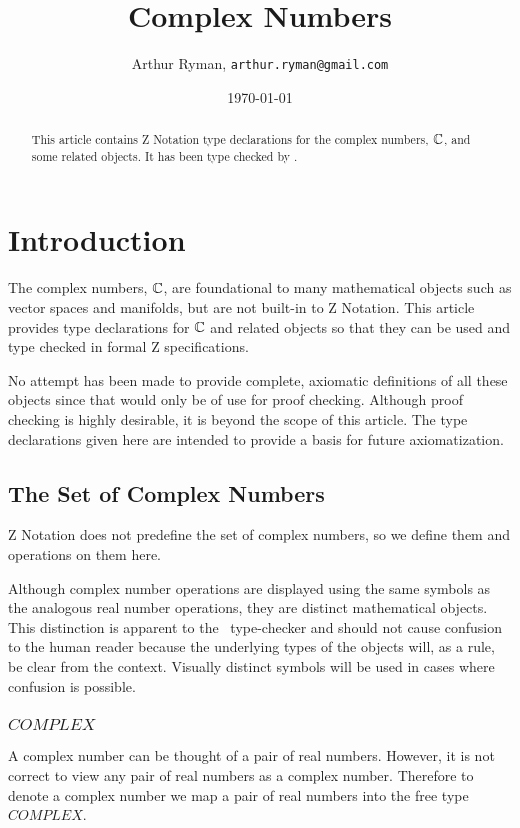 \documentclass[11pt, oneside]{article}
\title{Complex Numbers}
\author{Arthur Ryman, {\tt arthur.ryman@gmail.com}}
\date{\today}
\begin{document}
\maketitle

\begin{abstract}
This article contains Z Notation type declarations for the complex numbers, $\mathbb{C}$, and some related objects.
It has been type checked by \fuzz.
\end{abstract}

\tableofcontents

\section{Introduction}

The complex numbers, $\mathbb{C}$, are foundational to many mathematical objects such as vector spaces and manifolds,
but are not built-in to Z Notation.
This article provides type declarations for $\mathbb{C}$ and related objects so that they can be used and type checked in formal Z specifications.

No attempt has been made to provide complete, axiomatic definitions of all these objects since that would only be of use for proof checking.
Although proof checking is highly desirable, it is beyond the scope of this article.
The type declarations given here are intended to provide a basis for future axiomatization.

\subsection{The Set of Complex Numbers}

Z Notation does not predefine the set of complex numbers, so we define
them and operations on them here.

Although complex number operations are displayed using the same symbols as the 
analogous real number operations,
they are distinct mathematical objects.
This distinction is apparent to the \fuzz\ type-checker and should not cause confusion to the human reader
because the underlying types of the objects will, as a rule, be clear from the context.
Visually distinct symbols will be used in cases where confusion is possible.

\subsubsection{$COMPLEX$}

A complex number can be thought of a pair of real numbers.
However, it is not correct to view any pair of real numbers as a complex number.
Therefore to denote a complex number we map a pair of real numbers
into the free type $COMPLEX$.
\end{document}
